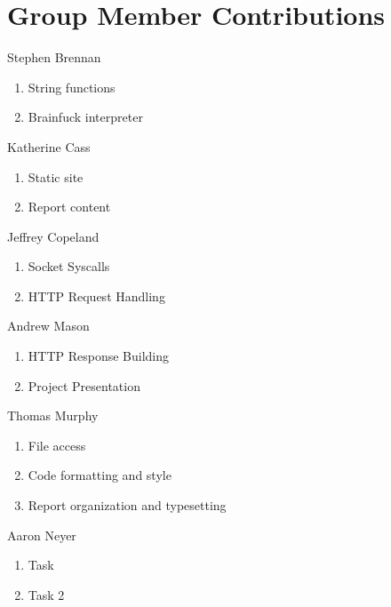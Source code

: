 \documentclass[journal,10pt]{IEEEtran}
\begin{document}
\section{Group Member Contributions}

\begin{LaTeXitemize} \itemsep0pt \parskip0pt
  \item Stephen Brennan
  \begin{enumerate}
    \item String functions
    \item Brainfuck interpreter
  \end{enumerate}

  \item Katherine Cass
  \begin{enumerate}
    \item Static site
    \item Report content
  \end{enumerate}

  \item Jeffrey Copeland
  \begin{enumerate}
    \item Socket Syscalls
    \item HTTP Request Handling
  \end{enumerate}

  \item Andrew Mason
  \begin{enumerate}
    \item HTTP Response Building
    \item Project Presentation
  \end{enumerate}

  \item Thomas Murphy
  \begin{enumerate}
    \item File access
    \item Code formatting and style
    \item Report organization and typesetting
  \end{enumerate}

  \item Aaron Neyer
  \begin{enumerate}
    \item Task
    \item Task 2
  \end{enumerate}

\end{LaTeXitemize}
\end{document}

